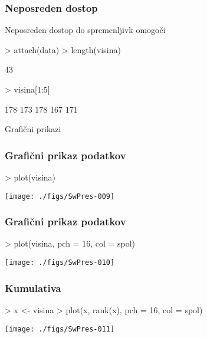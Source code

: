 \begin{frame}[fragile]
\frametitle{Neposreden dostop}
Neposreden dostop do spremenljivk omogoči
\begin{Schunk}
\begin{Sinput}
> attach(data)
> length(visina)
\end{Sinput}
\begin{Soutput}
[1] 43
\end{Soutput}
\begin{Sinput}
> visina[1:5]
\end{Sinput}
\begin{Soutput}
[1] 178 173 178 167 171
\end{Soutput}
\end{Schunk}
\end{frame}


Grafični prikazi
\begin{frame}[fragile]
\frametitle{Grafični prikaz podatkov}
 { {\vspace{-1cm}}}
\begin{Schunk}
\begin{Sinput}
> plot(visina)
\end{Sinput}
\end{Schunk}
\texttt{[image: ./figs/SwPres-009]}
\end{frame}
\begin{frame}[fragile]
\frametitle{Grafični prikaz podatkov}
 {\vspace{-1cm}}
\begin{Schunk}
\begin{Sinput}
> plot(visina, pch = 16, col = spol)
\end{Sinput}
\end{Schunk}
\texttt{[image: ./figs/SwPres-010]}
\end{frame}
\begin{frame}[fragile]
\frametitle{Kumulativa}
 {\vspace{-1cm}}
\begin{Schunk}
\begin{Sinput}
> x <- visina
> plot(x, rank(x), pch = 16, col = spol)
\end{Sinput}
\end{Schunk}
\texttt{[image: ./figs/SwPres-011]}
\end{frame}

